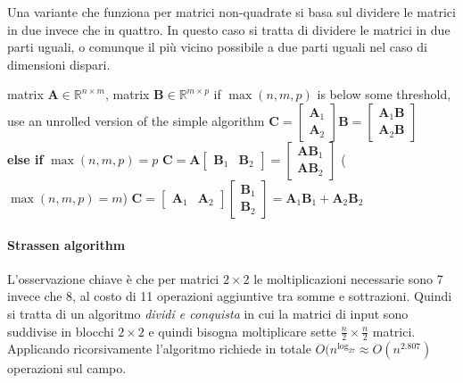 \documentclass[10pt]{article}
\begin{document}
Una variante che funziona per matrici non-quadrate si basa sul dividere le matrici in due invece che in quattro. In questo caso si tratta di dividere le matrici in due parti uguali, o comunque il più vicino possibile a due parti uguali nel caso di dimensioni dispari.

\begin{algorithm}
\caption{Moltiplicazione tra metrici tramite \textit{divide-and-conquer}}\label{alg:mul_div_conq}
\begin{algorithmic}[1]
\Require matrix $\mathbf{A} \in \mathbb{R}^{n\times m}$, matrix $\mathbf{B} \in \mathbb{R}^{m\times p}$
\State if $\max(n,m,p)$ is below some threshold, use an unrolled version of the simple algorithm
	\State $\mathbf{C} = \begin{bmatrix} \mathbf{A}_1 \\ \mathbf{A}_2 \end{bmatrix}\mathbf{B} = \begin{bmatrix} \mathbf{A}_1 \mathbf{B} \\ \mathbf{A}_2 \mathbf{B} \end{bmatrix}$ 
\\\textbf{else if} $\max(n,m,p) = p$
	\State $\mathbf{C} = \mathbf{A}\begin{bmatrix} \mathbf{B}_1 & \mathbf{B}_2 \end{bmatrix} = \begin{bmatrix} \mathbf{A} \mathbf{B}_1 \\ \mathbf{A} \mathbf{B}_2 \end{bmatrix}$ 
\Else \Comment($\max(n,m,p) = m$)
	\State $\mathbf{C} = \begin{bmatrix} \mathbf{A}_1 & \mathbf{A}_2 \end{bmatrix}\begin{bmatrix} \mathbf{B}_1 \\ \mathbf{B}_2 \end{bmatrix} = \mathbf{A}_1 \mathbf{B}_1 + \mathbf{A}_2 \mathbf{B}_2$ 
\EndIf
\end{algorithmic}
\end{algorithm}


\paragraph{Strassen algorithm}

L'osservazione chiave è che per matrici $2\times 2$ le moltiplicazioni necessarie sono 7 invece che 8, al costo di 11 operazioni aggiuntive tra somme e sottrazioni. Quindi si tratta di un algoritmo \textit{dividi e conquista} in cui la matrici di input sono suddivise in blocchi $2\times 2$ e quindi bisogna moltiplicare sette $\frac{n}{2}\times\frac{n}{2}$ matrici. Applicando ricorsivamente l'algoritmo richiede in totale $O(n^{\log_27}\approx O(n^{2.807})$ operazioni sul campo.
\end{document}

